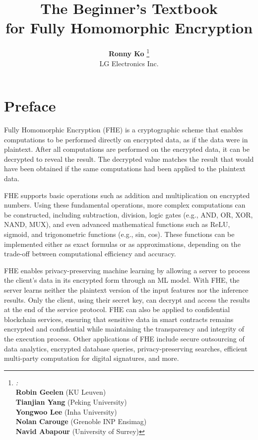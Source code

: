 \documentclass[11pt]{article}
\begin{document}
\title{\Huge{\textbf{The Beginner's Textbook}}\\ \Huge{\textbf{for Fully Homomorphic Encryption}}}
\author{
        \textbf{Ronny Ko} \thanks{\large \textit{:}\\  
        \textbf{Robin Geelen} (KU Leuven)\\  
        \textbf{Tianjian Yang} (Peking University)\\ \textbf{Yongwoo Lee} (Inha University) \\ \textbf{Nolan Carouge} (Grenoble INP Ensimag) \\
        \textbf{Navid Abapour} (University of Surrey)
        }
        \\{LG Electronics Inc.}}%
\date{}



\begin{titlingpage}
\maketitle
\end{titlingpage}


\clearpage

\section*{Preface}
Fully Homomorphic Encryption (FHE) is a cryptographic scheme that enables computations to be performed directly on encrypted data, as if the data were in plaintext. After all computations are performed on the encrypted data, it can be decrypted to reveal the result. The decrypted value matches the result that would have been obtained if the same computations had been applied to the plaintext data.

FHE supports basic operations such as addition and multiplication on encrypted numbers. Using these fundamental operations, more complex computations can be constructed, including subtraction, division, logic gates (e.g., AND, OR, XOR, NAND, MUX), and even advanced mathematical functions such as ReLU, sigmoid, and trigonometric functions (e.g., sin, cos). These functions can be implemented either as exact formulas or as approximations, depending on the trade-off between computational efficiency and accuracy. 

FHE enables privacy-preserving machine learning by allowing a server to process the client’s data in its encrypted form through an ML model. With FHE, the server learns neither the plaintext version of the input features nor the inference results. Only the client, using their secret key, can decrypt and access the results at the end of the service protocol.
FHE can also be applied to confidential blockchain services, ensuring that sensitive data in smart contracts remains encrypted and confidential while maintaining the transparency and integrity of the execution process.
Other applications of FHE include secure outsourcing of data analytics, encrypted database queries, privacy-preserving searches, efficient multi-party computation for digital signatures, and more.
\end{document}
